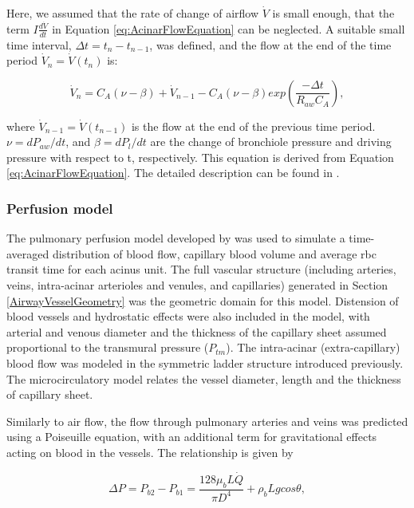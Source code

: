 Here, we assumed that the rate of change of airflow $\dot{V}$ is small enough, that the term $I\frac{d\dot{V}}{dt}$ in Equation \ref{eq:AcinarFlowEquation} can be neglected. A suitable small time interval, $\Delta t = t_n - t_{n-1}$, was defined, and the flow at the end of the time period $\dot{V}_n = \dot{V}(t_n)$ is:

\begin{equation}
 \label{eq:FlowRespectToTime}
 \dot{V}_n = C_A(\nu - \beta) + \dot{V}_{n-1} - C_A(\nu - \beta)exp(\frac{-\Delta t}{R_{aw}C_A}),
\end{equation}

\noindent where $\dot{V}_{n-1} = \dot{V}(t_{n-1})$ is the flow at the end of the previous time period. $\nu = dP_{aw}/dt$, and $\beta = dP_l/dt$ are the change of bronchiole pressure and driving pressure with respect to t, respectively. This equation is derived from Equation \ref{eq:AcinarFlowEquation}. The detailed description can be found in \cite{swan2012computational}.

\subsubsection{Perfusion model}
The pulmonary perfusion model developed by \cite{clark2011interdependent} was used to simulate a time-averaged distribution of blood flow, capillary blood volume and average \gls{rbc} transit time for each acinus unit. The full vascular structure (including arteries, veins, intra-acinar arterioles and venules, and capillaries) generated in Section \ref{AirwayVesselGeometry} was the geometric domain for this model. Distension of blood vessels and hydrostatic effects were also included in the model, with arterial and venous diameter and the thickness of the capillary sheet assumed proportional to the transmural pressure ($P_{tm}$). The intra-acinar (extra-capillary) blood flow was modeled in the symmetric ladder structure introduced previously. The microcirculatory model relates the vessel diameter, length and the thickness of capillary sheet.

Similarly to air flow, the flow through pulmonary arteries and veins was predicted using a Poiseuille equation, with an additional term for gravitational effects acting on blood in the vessels. The relationship is given by

\begin{equation}
 \label{eq:VesselFlow}
 \Delta P = P_{b2} - P_{b1} = \frac{128 \mu_bL\dot{Q}}{\pi D^{4}} + \rho_b Lgcos\theta,
\end{equation}


